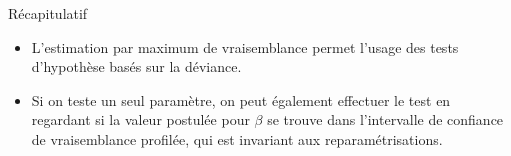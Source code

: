 \documentclass[
  ignorenonframetext,
]{beamer}
\providecommand{\tightlist}{%
  \setlength{\itemsep}{0pt}\setlength{\parskip}{0pt}}
\begin{document}
\begin{frame}{Récapitulatif}
\protect{}\label{ruxe9capitulatif-2}
\begin{itemize}
\tightlist
\item
  L'estimation par maximum de vraisemblance permet l'usage des tests
  d'hypothèse basés sur la déviance.
\item
  Si on teste un seul paramètre, on peut également effectuer le test en
  regardant si la valeur postulée pour \(\beta\) se trouve dans
  l'intervalle de confiance de vraisemblance profilée, qui est invariant
  aux reparamétrisations.
\end{itemize}
\end{frame}
\end{document}
